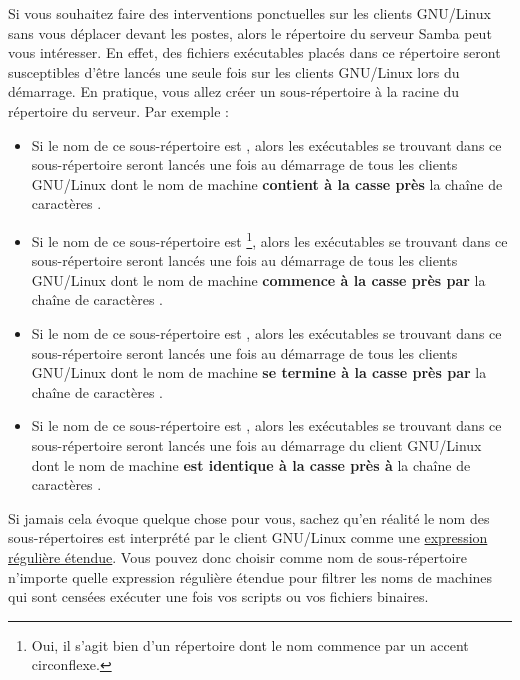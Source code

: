 Si vous souhaitez faire des interventions ponctuelles sur les clients
GNU/Linux sans vous déplacer devant les postes, alors le répertoire 
 du serveur Samba
peut vous intéresser. En effet, des fichiers exécutables
placés dans ce répertoire seront susceptibles d'être lancés une
seule fois
sur les clients GNU/Linux lors du démarrage.
En pratique, vous allez créer un sous-répertoire à la racine
du répertoire  du serveur. Par exemple :
%
\begin{itemize}
\item Si le nom de ce sous-répertoire est ,
alors les exécutables se trouvant dans ce sous-répertoire
seront lancés une fois au démarrage de tous les clients GNU/Linux dont le
nom de machine \textbf{contient à la casse près} 
la chaîne de caractères .

\item Si le nom de ce sous-répertoire est %
\footnote{Oui, il s'agit bien d'un répertoire dont le nom commence par un accent circonflexe.},
alors les exécutables se trouvant dans ce sous-répertoire
seront lancés une fois au démarrage de tous les clients GNU/Linux dont le
nom de machine \textbf{commence à la casse près par}
la chaîne de caractères .

\item Si le nom de ce sous-répertoire est ,
alors les exécutables se trouvant dans ce sous-répertoire
seront lancés une fois au démarrage de tous les clients GNU/Linux dont le
nom de machine \textbf{se termine à la casse près par}
la chaîne de caractères .


\item Si le nom de ce sous-répertoire est ,
alors les exécutables se trouvant dans ce sous-répertoire
seront lancés une fois au démarrage du client GNU/Linux dont le
nom de machine \textbf{est identique à la casse près à}
la chaîne de caractères .

\end{itemize}
%
Si jamais cela évoque quelque chose pour vous, sachez qu'en réalité le
nom des sous-répertoires est interprété par le client GNU/Linux comme une
\href{http://fr.wikipedia.org/wiki/Expression_rationnelle}{expression régulière étendue}.
Vous pouvez donc choisir comme nom de sous-répertoire n'importe quelle
expression régulière étendue pour filtrer les noms de machines qui
sont censées exécuter une fois vos scripts ou vos fichiers binaires.

